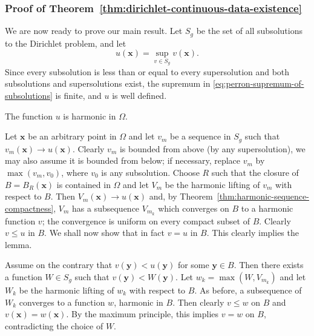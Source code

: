 \subsubsection{Proof of Theorem~\ref{thm:dirichlet-continuous-data-existence}}\label{subsec:perron-existence-proof}

We are now ready to prove our main result. Let $S_g$ be the set of all subsolutions to the Dirichlet problem, and let
\begin{equation}\label{eq:perron-supremum-of-subsolutions}
u(\bm{x})=\sup_{v\in S_g}v(\bm{x}).
\end{equation}
Since every subsolution is less than or equal to every supersolution and both subsolutions and supersolutions exist, the supremum in \eqref{eq:perron-supremum-of-subsolutions} is finite, and $u$ is well defined.

\begin{Lemma}
\label{lem:perron-envelope-harmonic}
The function $u$ is harmonic in $\Omega$.
\end{Lemma}

\begin{Proof}
Let $\bm{x}$ be an arbitrary point in $\Omega$ and let $v_m$ be a sequence in $S_g$ such that $v_m(\bm{x})\to u(\bm{x})$. Clearly $v_m$ is bounded from above (by any supersolution), we may also assume it is bounded from below; if necessary, replace $v_m$ by $\max(v_m,v_0)$, where $v_0$ is any subsolution. Choose $R$ such that the closure of $B=B_R(\bm{x})$ is contained in $\Omega$ and let $V_m$ be the harmonic lifting of $v_m$ with respect to $B$. Then $V_m(\bm{x})\to u(\bm{x})$ and, by Theorem~\ref{thm:harmonic-sequence-compactness}, $V_m$ has a subsequence $V_{m_k}$ which converges on $B$ to a harmonic function $v$; the convergence is uniform on every compact subset of $B$. Clearly $v\leq u$ in $B$. We shall now show that in fact $v=u$ in $B$. This clearly implies the lemma.

Assume on the contrary that $v(\bm{y})<u(\bm{y})$ for some $\bm{y}\in B$. Then there exists a function $W\in S_g$ such that $v(\bm{y})<W(\bm{y})$. Let $w_k=\max(W,V_{m_k})$ and let $W_k$ be the harmonic lifting of $w_k$ with respect to $B$. As before, a subsequence of $W_k$ converges to a function $w$, harmonic in $B$. Then clearly $v\leq w$ on $B$ and $v(\bm{x})=w(\bm{x})$. By the maximum principle, this implies $v=w$ on $B$, contradicting the choice of $W$.
\end{Proof}

